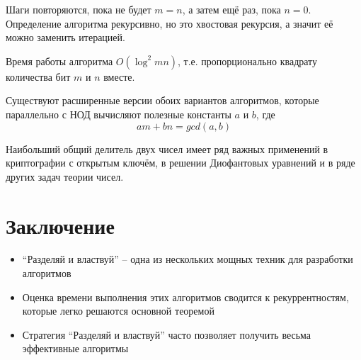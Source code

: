\documentclass[a4paper,11pt]{article}
\begin{document}
Шаги повторяются, пока не будет $m = n$, а затем ещё раз, пока $n = 0$.
Определение алгоритма рекурсивно, но это хвостовая рекурсия, а значит её
можно заменить итерацией.

Время работы алгоритма $O(\log^2 m n)$, т.е. пропорционально квадрату
количества бит $m$ и $n$ вместе.

Существуют расширенные версии обоих вариантов алгоритмов, которые параллельно с
НОД вычисляют полезные константы $a$ и $b$, где
\begin{equation*}
  a m + b n = gcd(a, b)
\end{equation*}

Наибольший общий делитель двух чисел имеет ряд важных применений в криптографии
с открытым ключём, в решении Диофантовых уравнений и в ряде других задач
теории чисел.

\section*{Заключение}
\begin{itemize}
\item ``Разделяй и властвуй'' -- одна из нескольких мощных техник для разработки
  алгоритмов
\item Оценка времени выполнения этих алгоритмов сводится к рекуррентностям,
  которые легко решаются основной теоремой
\item Стратегия ``Разделяй и властвуй'' часто позволяет получить весьма
  эффективные алгоритмы
\end{itemize}
\end{document}
